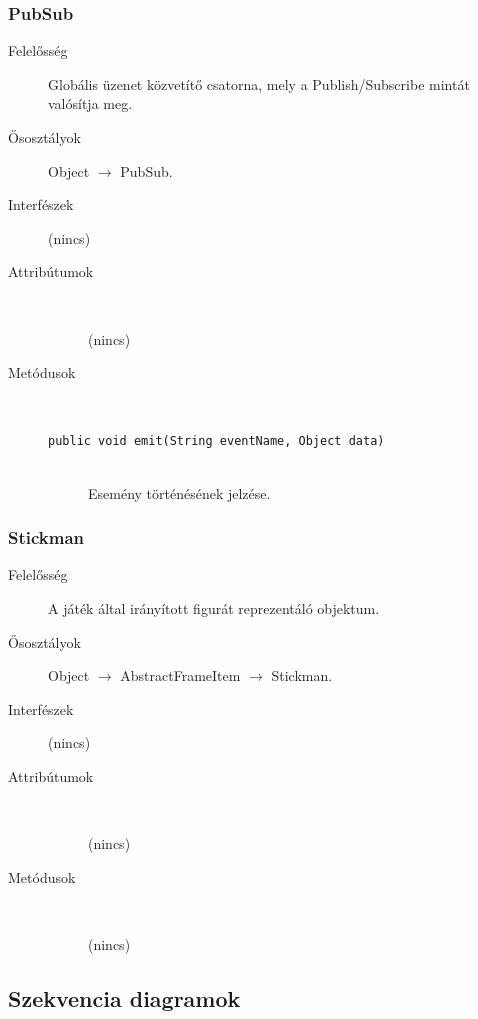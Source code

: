 		\subsubsection{PubSub}
		\begin{description}
		\item[Felelősség]
		Globális üzenet közvetítő csatorna, mely a Publish/Subscribe mintát valósítja meg.
		\item[Ősosztályok] Object $\rightarrow{}$ PubSub.
		\item[Interfészek] (nincs)
		\item[Attribútumok]$\ $
		\begin{description}
		\item[] (nincs)
		\end{description}
		\item[Metódusok]$\ $
		\begin{description}
			\item[\texttt{public void emit(String eventName, Object data)}] \hfill \\Esemény történésének jelzése.
		\end{description}
		\end{description}
		
		\subsubsection{Stickman}
		\begin{description}
		\item[Felelősség]
		A játék által irányított figurát reprezentáló objektum.
		\item[Ősosztályok] Object $\rightarrow{}$ AbstractFrameItem $\rightarrow{}$ Stickman.
		\item[Interfészek] (nincs)
		\item[Attribútumok]$\ $
		\begin{description}
		\item[] (nincs)
		\end{description}
		\item[Metódusok]$\ $
		\begin{description}
		\item[] (nincs)
		\end{description}
		\end{description}
	
	\subsection{Szekvencia diagramok}
	

